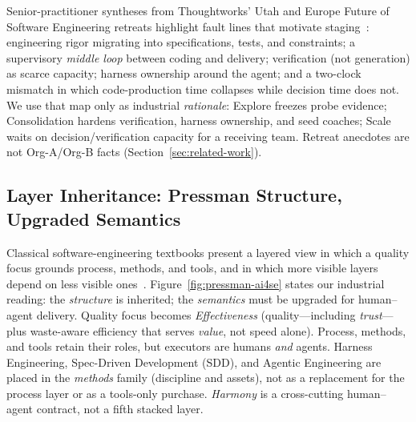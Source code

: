\documentclass[10pt,conference]{IEEEtran}
\begin{document}
Senior-practitioner syntheses from Thoughtworks' Utah and Europe Future of
Software Engineering retreats highlight fault lines that motivate
staging~\cite{Thoughtworks2026UtahRetreat,Thoughtworks2026EuropeRetreat}:
engineering rigor migrating into specifications, tests, and constraints; a
supervisory \emph{middle loop} between coding and delivery; verification
(not generation) as scarce capacity; harness ownership around the agent; and
a two-clock mismatch in which code-production time collapses while decision
time does not.
We use that map only as industrial \emph{rationale}: Explore freezes probe
evidence; Consolidation hardens verification, harness ownership, and seed
coaches; Scale waits on decision/verification capacity for a receiving team.
Retreat anecdotes are not Org-A/Org-B facts
(Section~\ref{sec:related-work}).

\subsection{Layer Inheritance: Pressman Structure, Upgraded Semantics}
\label{sec:pressman}

Classical software-engineering textbooks present a layered view in which a
quality focus grounds process, methods, and tools, and in which more visible
layers depend on less visible ones~\cite{Pressman2014SEPA}.
Figure~\ref{fig:pressman-ai4se} states our industrial reading: the
\emph{structure} is inherited; the \emph{semantics} must be upgraded for
human--agent delivery.
Quality focus becomes \emph{Effectiveness} (quality---including
\emph{trust}---plus waste-aware efficiency that serves \emph{value}, not
speed alone).
Process, methods, and tools retain their roles, but executors are humans
\emph{and} agents.
Harness Engineering, Spec-Driven Development (SDD), and Agentic Engineering
are placed in the \emph{methods} family (discipline and assets), not as a
replacement for the process layer or as a tools-only purchase.
\emph{Harmony} is a cross-cutting human--agent contract, not a fifth stacked
layer.
\end{document}
